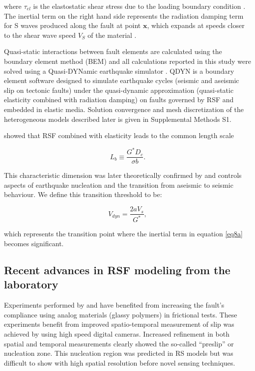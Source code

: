 \documentclass[preprint,1p, 10pt,authoryear]{elsarticle}
\begin{document}
\noindent where $\tau_{el}$ is the elastostatic shear stress due to the loading boundary condition \citep{Horowitz1989}. The inertial term on the right hand side represents the radiation damping term for S waves produced along the fault at point $\mathbf{x}$, which expands at speeds closer to the shear wave speed $V_{S}$ of the material \citep{Rice1993}. 

Quasi-static interactions between fault elements are calculated using the boundary element method (BEM) and all calculations reported in this study were solved using a Quasi-DYNamic earthquake simulator \citep{Luo2017}. QDYN is a boundary element software designed to simulate earthquake cycles (seismic and aseismic slip on tectonic faults) under the quasi-dynamic approximation (quasi-static elasticity combined with radiation damping) on faults governed by RSF and embedded in elastic media.  Solution convergence and mesh discretization of the heterogeneous models described later is given in Supplemental Methods S1.

\citet{Dieterich1992} showed that RSF combined with elasticity leads to the common length scale

\begin{equation}
\label{eq8b}
L_{b} \equiv \frac{G^{*}D_{c}}{\sigma b}.
\end{equation}  

\noindent This characteristic dimension was later theoretically confirmed by \citet{Rubin2005} and controls aspects of earthquake nucleation and the transition from aseismic to seismic behaviour. We define this transition threshold to be:

\begin{equation}
\label{eq8c}
V_{dyn} = \frac{2 a V_{s}}{G^{*}},
\end{equation}  

\noindent which represents the transition point where the inertial term in equation \eqref{eq8a} becomes significant. 

\subsection{Recent advances in RSF modeling from the laboratory}
\label{advances RSF}
Experiments performed by \citet{Nielsen2010} and \citet{Latour2013} have benefited from increasing the fault's compliance using analog materials (glassy polymers) in frictional tests. These experiments benefit from improved spatio-temporal measurement of slip was achieved by using high speed digital cameras. Increased refinement in both spatial and temporal measurements clearly showed the so-called ``preslip'' or nucleation zone.  This nucleation region was predicted in RS models \citep{Dieterich1992, Rubin2005, Ampuero2008} but was difficult to show with high spatial resolution before novel sensing techniques.
\end{document}
